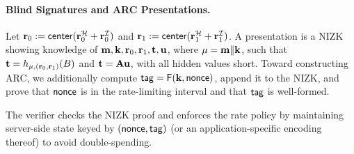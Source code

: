	
	
\paragraph{Blind Signatures and ARC Presentations.}
Let \(\mathbf{r}_0:=\mathsf{center}(\mathbf{r}_0^{\mathcal{H}}+\mathbf{r}_0^{\mathcal{I}})\) and
\(\mathbf{r}_1:=\mathsf{center}(\mathbf{r}_1^{\mathcal{H}}+\mathbf{r}_1^{\mathcal{I}})\). A presentation is a NIZK showing knowledge of
\(\mathbf{m},\mathbf{k},\mathbf{r}_0,\mathbf{r}_1,\mathbf{t},\mathbf{u}\), where \(\mathbf{\mu}=\mathbf{m}\Vert \mathbf{k}\), such that
\(\mathbf{t}=h_{\mathbf{\mu},(\mathbf{r}_0,\mathbf{r}_1)}(B)\) and \(\mathbf{t}=\mathbf{A}\mathbf{u}\), with all hidden values short. Toward constructing ARC,
we additionally compute \(\mathsf{tag}=\mathsf{F}(\mathbf{k},\mathsf{nonce})\), append it to the NIZK, and prove that \(\mathsf{nonce}\) is in the
rate-limiting interval and that \(\mathsf{tag}\) is well-formed.
	

The verifier checks the NIZK proof and enforces the rate policy by maintaining server-side state keyed by
\((\mathsf{nonce},\mathsf{tag})\) (or an application-specific encoding thereof) to avoid double-spending.

